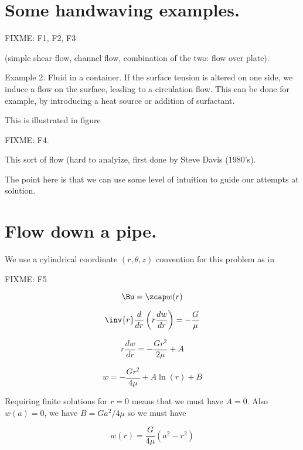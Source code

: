 \section{Some handwaving examples.}

FIXME: F1, F2, F3

(simple shear flow, channel flow, combination of the two: flow over plate).

Example 2.  Fluid in a container.  If the surface tension is altered on one side, we induce a flow on the surface, leading to a circulation flow.  This can be done for example, by introducing a heat source or addition of surfactant.

This is illustrated in figure

FIXME: F4.

This sort of flow (hard to analyize, first done by Steve Davis (1980's).

The point here is that we can use some level of intuition to guide our attempts at solution.

\section{Flow down a pipe.}

We use a cylindrical coordinate $(r, \theta, z)$ convention for this problem as in

FIXME: F5

\begin{equation}\label{eqn:continuumL12:50}
\Bu = \zcap w(r)
\end{equation}

\begin{equation}\label{eqn:continuumL12:70}
\inv{r} \frac{d}{dr} \left( r \frac{dw}{dr} \right) = - \frac{G}{\mu}
\end{equation}

\begin{equation}\label{eqn:continuumL12:90}
r \frac{dw}{dr} = - \frac{G r^2}{2\mu} + A
\end{equation}

\begin{equation}\label{eqn:continuumL12:110}
w = -\frac{G r^2}{4 \mu} + A \ln(r) + B
\end{equation}

Requiring finite solutions for $r = 0$ means that we must have $A = 0$.  Also $w(a) = 0$, we have $B = G a^2/4 \mu$ so we must have

\begin{equation}\label{eqn:continuumL12:130}
w(r) = \frac{G}{4 \mu}( a^2 - r^2 )
\end{equation}

